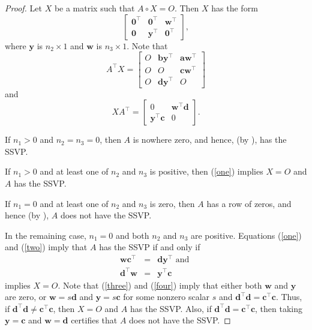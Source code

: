 \documentclass[preprint,12pt]{elsarticle}
\newcommand{\trans  }{^\top}
\begin{document}
\begin{proof}
Let $X$ be a matrix such that $A\circ X=O$.
Then $X$ has the form
\[
\left[ 
\begin{array}{lcc}
\mathbf 0\trans & \mathbf 0\trans  & \mathbf w\trans \\
\mathbf 0 & \mathbf y\trans  & \mathbf 0\trans  
\end{array}
\right],
\]
where $\mathbf y$ is $n_2\times 1$ and $\mathbf w$ is $n_3 \times 1$.  Note that 
\begin{equation}
\label{one} A\trans  X= 
\left[ 
\begin{array}{ccc}
O &  \mathbf  b \mathbf y\trans  &  \mathbf a \mathbf w\trans   \\
O & O &  \mathbf c \mathbf w\trans    \\
O & \mathbf d \mathbf y\trans  & O 
\end{array} 
\right] 
\end{equation}
and 
\begin{equation}
\label{two}
XA\trans= \left[ 
\begin{array}{cc}
0 &  \mathbf w\trans \mathbf  d \\
\mathbf y\trans \mathbf  c &  0 
\end{array}
\right].
\end{equation}

If $n_1>0$ and $n_2=n_3=0$, then $A$ is nowhere zero, and hence, (by ), has the SSVP.

If $n_1>0$  and at least one of $n_2$ and $n_3$ is positive, then (\ref{one}) implies $X=O$ and $A$ has the SSVP.

If $n_1=0$ and at least one of $n_2$ and $n_3$ is zero, then $A$ has a row of zeros, and hence (by ), $A$ does not have the SSVP.

In the remaining case, $n_1=0$  and both $n_2$ and $n_3$ are positive.  Equations (\ref{one}) and (\ref{two}) imply that $A$ has the SSVP if and only if 
\begin{eqnarray}
\label{three}
\mathbf w \mathbf c\trans & = & \mathbf d \mathbf y\trans  \mbox{ and }\\
\label{four}
\mathbf d\trans \mathbf  w&= & \mathbf y\trans \mathbf c
\end{eqnarray}
implies $X=O$.  Note that (\ref{three}) and (\ref{four}) imply that either both $\mathbf w$ and $ \mathbf y$ are zero, or 
$\mathbf w=s \mathbf d$ and  $\mathbf y= s \mathbf c$  for some nonzero scalar $s$ and $\mathbf d \trans \mathbf d=\mathbf c\trans \mathbf c$. Thus, if $\mathbf d \trans \mathbf d \neq \mathbf c\trans \mathbf c$, then  $X=O$ and $A$ has the SSVP.
Also, if $\mathbf d  \trans \mathbf d = \mathbf c\trans \mathbf c$, then taking $\mathbf y= \mathbf c$ and $\mathbf w= \mathbf d$
certifies that $A$ does not have the SSVP. 
\end{proof}
\end{document}
